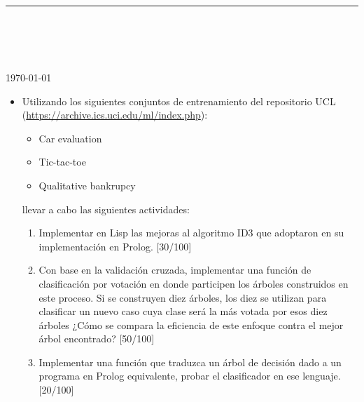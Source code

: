 



\thispagestyle{empty}

\begin{center}
\textsc{\theinstitution}\\[2mm]

\thedepartment

\rule{0.6\textwidth}{0.5pt}\\[2mm]

\thecourse \\[4mm]

{\Large \textbf{\thetitle}}\\[2mm]

\theauthor \\[2mm]

{\small \today}
\end{center}
\medskip

\vspace{1cm}

\begin{itemize}
    \item Utilizando los siguientes conjuntos de entrenamiento del repositorio UCL (\url{https://archive.ics.uci.edu/ml/index.php}):
    \begin{itemize}
        \item Car evaluation
        \item Tic-tac-toe
        \item Qualitative bankrupcy
    \end{itemize}
    llevar a cabo las siguientes actividades:
    \begin{enumerate}
        \item Implementar en Lisp las mejoras al algoritmo ID3 que adoptaron en su implementación en Prolog. [30/100]
        \item Con base en la validación cruzada, implementar una función de clasificación por votación en donde participen los árboles construidos en este proceso. Si se construyen diez árboles, los diez se utilizan para clasificar un nuevo caso cuya clase será la más votada por esos diez árboles ¿Cómo se compara la eficiencia de este enfoque contra el mejor árbol encontrado? [50/100]
        \item Implementar una función que traduzca un árbol de decisión dado a un programa en Prolog equivalente, probar el clasificador en ese lenguaje. [20/100]
    \end{enumerate}
\end{itemize}

